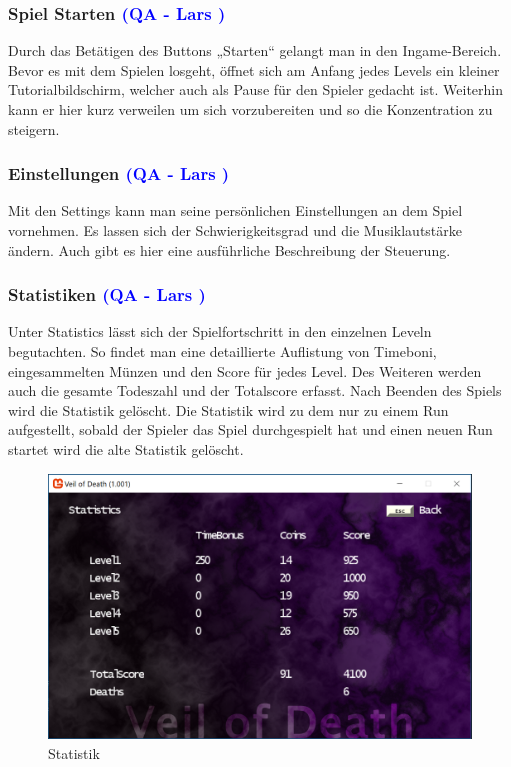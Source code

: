 \documentclass[12pt]{article}
\begin{document}
\vspace{1cm}
\subsubsection{Spiel Starten \textcolor{blue}{(QA - Lars )}}

Durch das Betätigen des Buttons „Starten“ gelangt man in den Ingame-Bereich. Bevor es mit dem Spielen losgeht, öffnet sich am Anfang jedes
Levels ein kleiner Tutorialbildschirm, welcher auch als Pause für den Spieler gedacht ist. Weiterhin kann er hier kurz verweilen um sich vorzubereiten
und so die Konzentration zu steigern.

\vspace{1cm}
\subsubsection{Einstellungen \textcolor{blue}{(QA - Lars )}}

Mit den Settings kann man seine persönlichen Einstellungen an dem Spiel vornehmen. Es lassen sich der Schwierigkeitsgrad und die Musiklautstärke
ändern. Auch gibt es hier eine ausführliche Beschreibung der Steuerung.

\vspace{1cm}
\subsubsection{Statistiken \textcolor{blue}{(QA - Lars )}}

Unter Statistics lässt sich der Spielfortschritt in den einzelnen Leveln begutachten. So findet man eine detaillierte Auflistung von Timeboni, eingesammelten
Münzen und den Score für jedes Level. Des Weiteren werden auch die gesamte Todeszahl und der Totalscore erfasst. Nach Beenden des Spiels wird
die Statistik gelöscht. Die Statistik wird zu dem  nur zu einem Run aufgestellt, sobald der Spieler das Spiel durchgespielt hat und einen neuen Run startet
wird die alte Statistik gelöscht.

\begin{figure}
	\centering
	\includegraphics[width=1\textwidth]{Statistics}
	\caption{Statistik
		\label{fig:statistics}}
\end{figure}
\end{document}
